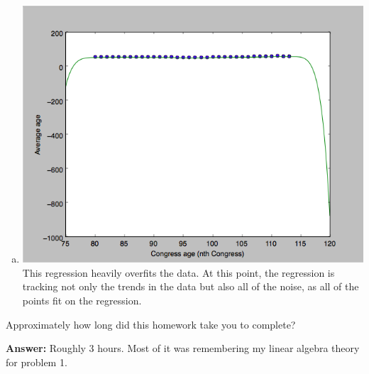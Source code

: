 \documentclass[submit]{harvardml}
\begin{document}
\begin{enumerate}[(a)]
	\item \includegraphics[scale = 0.3]{./e}\\
		This regression heavily overfits the data. At this point, the regression is tracking not only the trends in the
		data but also all of the noise, as all of the points fit on the regression. 
\end{enumerate}










\newpage
\begin{problem}[Calibration, 1pt]
Approximately how long did this homework take you to complete?
\end{problem}
\textbf{Answer:}
Roughly 3 hours. Most of it was remembering my linear algebra theory for problem 1. 
\end{document}
